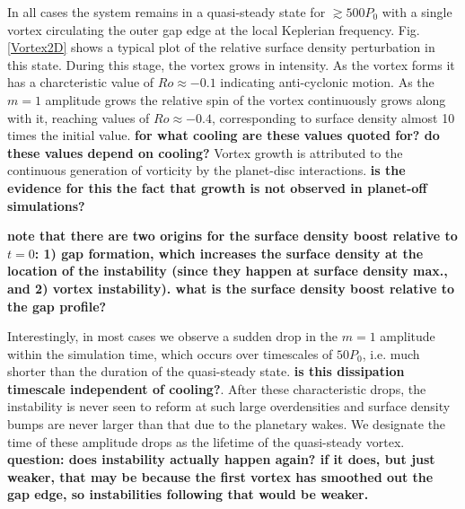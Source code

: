 In all cases the system remains in a quasi-steady state for
$\gtrsim500P_0$ with a single vortex circulating 
the outer gap edge at the local Keplerian  
frequency. Fig. \ref{Vortex2D} shows a typical plot of the relative 
surface density perturbation in this state. During this stage, the 
vortex grows in intensity. As the vortex forms it has a
charcteristic value of $Ro\approx-0.1$ indicating anti-cyclonic
motion. As the $m=1$ amplitude grows the relative spin of the vortex
continuously grows along with it, reaching values of
$Ro\approx-0.4$, corresponding to surface density almost 10 times the
initial value. {\bf for what cooling are these values quoted for? do
  these values depend on cooling?} Vortex growth is attributed to
the continuous generation of vorticity by the planet-disc interactions. 
{\bf is the evidence for this the fact that growth is not observed in
  planet-off simulations?}   

{\bf note that there
  are two origins for the surface density boost relative to $t=0$: 1) gap
  formation, which increases the surface density at the location of
  the instability (since they happen at surface density max., and 2)
  vortex instability). what is the surface density boost relative to
  the gap profile?}   


Interestingly, in most cases we observe a sudden drop in 
the $m=1$ amplitude within the simulation time, which occurs over
timescales of $50P_0$, i.e. much shorter than the duration of the quasi-steady
state. {\bf is this dissipation timescale independent of cooling?}.  
After these characteristic drops, the instability is never seen to
reform at such large overdensities and surface density bumps are never larger
than that due to the planetary wakes. We designate the time of these
amplitude drops as the lifetime 
of the quasi-steady vortex.  
{\bf question: does instability
  actually happen again? if it does, but just weaker, that may be
  because the first vortex has smoothed out the gap edge, so
  instabilities following that would be weaker.}




